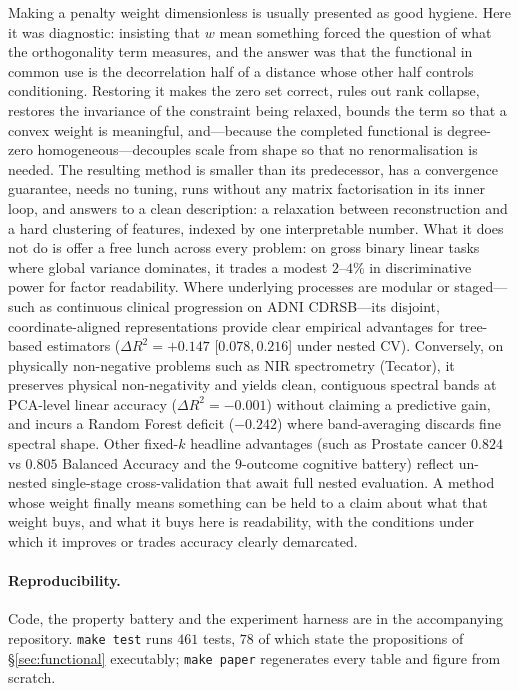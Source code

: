 \documentclass[11pt]{article}
\theoremstyle{definition}
\begin{document}
Making a penalty weight dimensionless is usually presented as good hygiene. Here
it was diagnostic: insisting that $w$ mean something forced the question of what
the orthogonality term measures, and the answer was that the functional in common
use is the decorrelation half of a distance whose other half controls
conditioning. Restoring it makes the zero set correct, rules out rank collapse,
restores the invariance of the constraint being relaxed, bounds the term so that
a convex weight is meaningful, and---because the completed functional is
degree-zero homogeneous---decouples scale from shape so that no renormalisation
is needed. The resulting method is smaller than its predecessor, has a
convergence guarantee, needs no tuning, runs without any matrix factorisation in
its inner loop, and answers to a clean description: a relaxation between
reconstruction and a hard clustering of features, indexed by one interpretable
number. What it does not do is offer a free lunch across every problem: on gross
binary linear tasks where global variance dominates, it trades a modest $2$--$4\%$
in discriminative power for factor readability. Where underlying processes are
modular or staged---such as continuous clinical progression on ADNI CDRSB---its
disjoint, coordinate-aligned representations provide clear empirical advantages
for tree-based estimators ($\Delta R^2 = +0.147$ [$0.078, 0.216$] under nested CV).
Conversely, on physically non-negative problems such as NIR spectrometry (Tecator),
it preserves physical non-negativity and yields clean, contiguous spectral bands at
PCA-level linear accuracy ($\Delta R^2 = -0.001$) without claiming a predictive gain,
and incurs a Random Forest deficit ($-0.242$) where band-averaging discards fine
spectral shape. Other fixed-$k$ headline advantages (such as Prostate cancer $0.824$
vs $0.805$ Balanced Accuracy and the 9-outcome cognitive battery) reflect un-nested
single-stage cross-validation that await full nested evaluation.
A method whose weight finally means something can be held to a claim about what that
weight buys, and what it buys here is readability, with the conditions under which it
improves or trades accuracy clearly demarcated.

\paragraph{Reproducibility.} Code, the property battery and the experiment
harness are in the accompanying repository. \texttt{make test} runs $461$
tests, $78$ of which state the propositions of \S\ref{sec:functional}
executably; \texttt{make paper} regenerates every table and figure from scratch.
\end{document}
